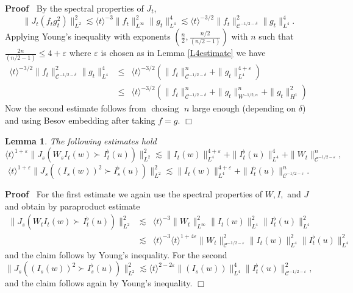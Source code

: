 \documentclass[11pt]{article}
\newcommand{\tmop}[1]{\ensuremath{\operatorname{#1}}}
\newenvironment{proof}{\noindent\textbf{Proof\ }}{\hspace*{\fill}$\Box$\medskip}
\newtheorem{lemma}{Lemma}
\newcommand{\VV}{\mathscr{C}}
\begin{document}
\begin{proof}
  By the spectral properties of $J_t$,
  \[ \| J_t (f_t g_t^2) \|^2_{L^2} \lesssim \langle t \rangle^{- 3} \| f_t
     \|^2_{L^{\infty}} \| g_t \|^4_{L^4} \lesssim \langle t \rangle^{- 3 / 2}
     \| f_t \|^2_{\VV^{- 1 / 2 - \delta}} \| g_t \|_{L^4}^4 . \]
  Applying Young's inequality with exponents $\left( \frac{n}{2}, \frac{n /
  2}{(n / 2 - 1)} \right)$ with $n$ such that $\frac{2 n}{(n / 2 - 1)}
  \leqslant 4 + \varepsilon$ where $\varepsilon$ is chosen as in Lemma
  \ref{L4estimate} we have
  \begin{eqnarray*}
    \langle t \rangle^{- 3 / 2} \| f_t \|^2_{\VV^{- 1 / 2 - \delta}} \| g_t
    \|_{L^4}^4 & \leqslant & \langle t \rangle^{- 3 / 2} \left( \| f_t
    \|^n_{\VV^{- 1 / 2 - \delta}} + \| g_t \|_{L^4}^{4 + \varepsilon}
    \right)\\
    & \leqslant & \langle t \rangle^{- 3 / 2} \left( \| f_t \|^n_{\VV^{- 1 /
    2 - \delta}} + \| g_t \|_{W^{- 1 / 2, n}}^n + \| g_t \|^2_{H^1} \right)
  \end{eqnarray*}
  Now the second estimate follows from $\tmop{chosing}$ $n$ large enough
  (depending on $\delta$) and using Besov embedding after taking $f = g$.
\end{proof}

\begin{lemma}
  The following estimates hold\label{analyticestimate3}
  \[ \langle t \rangle^{1 + \varepsilon} \| J_s (W_s I_t (w) \succ_{}
     I^{\flat}_t (u)) \|^2_{L^2} \lesssim \| I_t (w) \|^{4 +
     \varepsilon}_{L^4} + \| I^{\flat}_t (u) \|^4_{L^4} + \| W_t \|^n_{\VV^{-
     1 / 2 - \varepsilon}}, \]
  \[ \langle t \rangle^{1 + \varepsilon} \| J_s ((I_s (w))^2 \succ I^{\flat}_s
     (u)) \|^2_{L^2} \lesssim \| I_t (w) \|^{4 + \varepsilon}_{L^4} + \|
     I^{\flat}_t (u) \|^n_{\VV^{- 1 / 2 - \varepsilon}} . \]
\end{lemma}

\begin{proof}
  For the first estimate we again use the spectral properties of $W, I,$ and
  $J$ and obtain by paraproduct estimate
  \begin{eqnarray*}
    \| J_s (W_t I_t (w) \succ_{} I^{\flat}_t (u)) \|^2_{L^2} & \lesssim &
    \langle t \rangle^{- 3} \| W_t \|^2_{L^{\infty}} \| I_t (w) \|_{L^4}^2 \|
    I^{\flat}_t (u) \|^2_{L^4}\\
    & \lesssim & \langle t \rangle^{- 3} \langle t \rangle^{1 + 4
    \varepsilon} \| W_t \|^2_{\VV^{- 1 / 2 - \varepsilon}} \| I_t (w)
    \|_{L^4}^2 \| I^{\flat}_t (u) \|^2_{L^4}
  \end{eqnarray*}
  and the claim follows by Young's inequality. For the second
  \[ \| J_s ((I_s (w))^2 \succ I^{\flat}_s (u)) \|^2_{L^2} \lesssim \langle t
     \rangle^{2 - 2 \varepsilon} \| (I_s (w)) \|_{L^4}^4 \| I^{\flat}_t (u)
     \|^2_{\VV^{- 1 / 2 - \varepsilon}}, \]
  and the claim follows again by Young's inequality. 
\end{proof}
\end{document}
